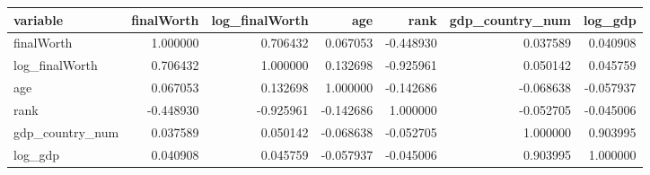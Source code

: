 \begin{tabular}{lrrrrrr}
\toprule
variable & finalWorth & log\_finalWorth & age & rank & gdp\_country\_num & log\_gdp \\
\midrule
finalWorth & 1.000000 & 0.706432 & 0.067053 & -0.448930 & 0.037589 & 0.040908 \\
log\_finalWorth & 0.706432 & 1.000000 & 0.132698 & -0.925961 & 0.050142 & 0.045759 \\
age & 0.067053 & 0.132698 & 1.000000 & -0.142686 & -0.068638 & -0.057937 \\
rank & -0.448930 & -0.925961 & -0.142686 & 1.000000 & -0.052705 & -0.045006 \\
gdp\_country\_num & 0.037589 & 0.050142 & -0.068638 & -0.052705 & 1.000000 & 0.903995 \\
log\_gdp & 0.040908 & 0.045759 & -0.057937 & -0.045006 & 0.903995 & 1.000000 \\
\bottomrule
\end{tabular}

